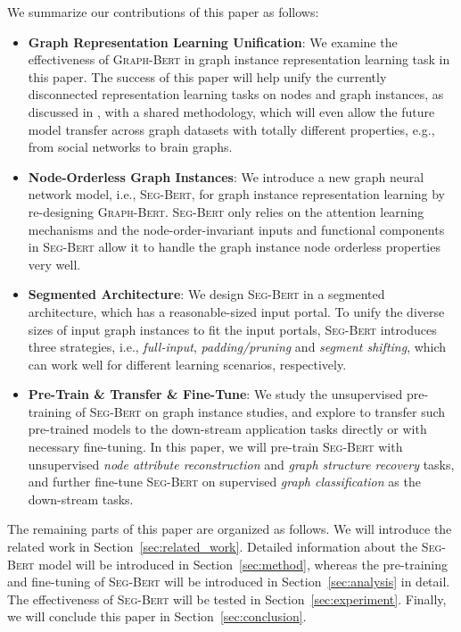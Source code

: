 \documentclass{article}
\newcommand{\our}{\textsc{Seg-Bert}}
\newcommand{\gbert}{\textsc{Graph-Bert}}
\begin{document}
We summarize our contributions of this paper as follows:
\begin{itemize}

\item \textbf{Graph Representation Learning Unification}: We examine the effectiveness of {\gbert} in graph instance representation learning task in this paper. The success of this paper will help unify the currently disconnected representation learning tasks on nodes and graph instances, as discussed in \cite{zhang2019graph}, with a shared methodology, which will even allow the future model transfer across graph datasets with totally different properties, e.g., from social networks to brain graphs.

\item \textbf{Node-Orderless Graph Instances}: We introduce a new graph neural network model, i.e., {\our}, for graph instance representation learning by re-designing {\gbert}. {\our} only relies on the attention learning mechanisms and the node-order-invariant inputs and functional components in {\our} allow it to handle the graph instance node orderless properties very well.

\item \textbf{Segmented Architecture}: We design {\our} in a segmented architecture, which has a reasonable-sized input portal. To unify the diverse sizes of input graph instances to fit the input portals, {\our} introduces three strategies, i.e., \textit{full-input}, \textit{padding/pruning} and \textit{segment shifting}, which can work well for different learning scenarios, respectively.

\item \textbf{Pre-Train \& Transfer \& Fine-Tune}: We study the unsupervised pre-training of {\our} on graph instance studies, and explore to transfer such pre-trained models to the down-stream application tasks directly or with necessary fine-tuning. In this paper, we will pre-train {\our} with unsupervised \textit{node attribute reconstruction} and \textit{graph structure recovery} tasks, and further fine-tune {\our} on supervised \textit{graph classification} as the down-stream tasks.

\end{itemize}


The remaining parts of this paper are organized as follows. We will introduce the related work in Section~\ref{sec:related_work}. Detailed information about the {\our} model will be introduced in Section~\ref{sec:method}, whereas the pre-training and fine-tuning of {\our} will be introduced in Section~\ref{sec:analysis} in detail. The effectiveness of {\our} will be tested in Section~\ref{sec:experiment}. Finally, we will conclude this paper in Section~\ref{sec:conclusion}.
\end{document}

